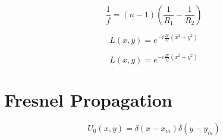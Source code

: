 \documentclass{kepfl}
\begin{document}
\begin{equation}
\frac{1}{f} = (n - 1)\left( {\frac{1}{{{R_1}}} - \frac{1}{{{R_2}}}} \right)	
\end{equation}

\begin{equation}
L(x,y) = {e^{ - i\frac{{2\pi }}{{\lambda f}}({x^2} + {y^2})}}
\end{equation}

\begin{equation}	
L(x,y) = {e^{ - i\frac{{2\pi }}{{\lambda f}}({x^2} + {y^2})}}
\end{equation}

\section{Fresnel Propagation}
\begin{equation}
	{U_0}(x,y) = \delta (x - {x_m})\delta (y - {y_m})
\end{equation}
\end{document}
